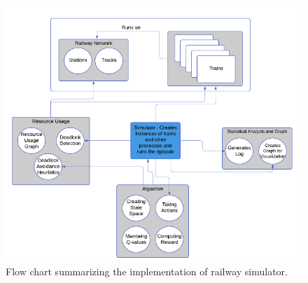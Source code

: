 \begin{figure}[h]
    \centering
    \includegraphics[width=1.0\textwidth]{Implementation}
    \caption{ Flow chart summarizing the implementation of railway simulator.  }
    \label{image-myimage1}
\end{figure}


